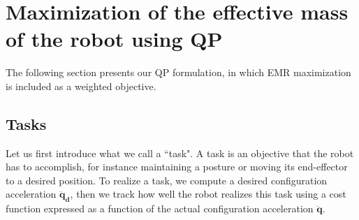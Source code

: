 \documentclass[conference]{IEEEtran}
\begin{document}
\section{Maximization of the effective mass of the robot using QP}
\label{Optimization of the effective mass using QP}
\noindent
The following section presents our QP formulation, in which EMR maximization is included as a weighted objective.
\subsection{Tasks}
\noindent
Let us first introduce what we call a ``task". A task is an objective that the robot has to accomplish, for instance maintaining a posture or moving its end-effector to a desired position.
To realize a task, we compute a desired configuration acceleration $\mathbf{\ddot q_d}$, then we track how well the robot realizes this task using a cost function expressed as a function of the actual configuration acceleration $\mathbf{\ddot q}$.
\end{document}
